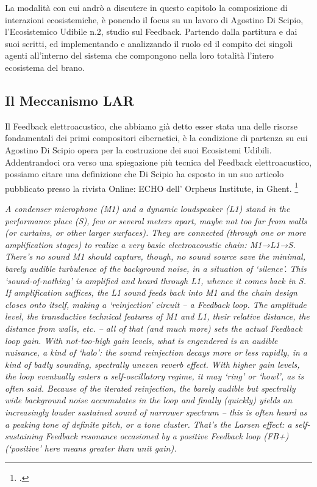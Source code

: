 La modalità con cui andrò a discutere in questo capitolo la composizione di interazioni ecosistemiche, 
è ponendo il focus su un lavoro di Agostino Di Scipio, l’Ecosistemico Udibile n.2, studio sul Feedback. 
Partendo dalla partitura e dai suoi scritti, ed implementando e analizzando
il ruolo ed il compito dei singoli agenti all'interno del sistema 
che compongono nella loro totalità l'intero ecosistema del brano. 

\subsection{Il Meccanismo LAR}
\label{sec:Il Meccanismo LAR}
Il Feedback elettroacustico, che abbiamo già detto
esser stata una delle risorse fondamentali dei primi compositori cibernetici,
è la condizione di partenza su cui Agostino Di Scipio opera per la costruzione dei suoi Ecosistemi Udibili.
Addentrandoci ora verso una spiegazione più tecnica del Feedback elettroacustico,
possiamo citare una definizione che Di Scipio ha esposto in un suo articolo
pubblicato presso la rivista Online: ECHO dell’ Orpheus Institute, in
Ghent. \footcite{di_scipio_relational_2022}

\begin{center}
\vspace{0.5cm}
\textit{A condenser microphone (M1) and a dynamic loudspeaker (L1) stand in the performance place
(S), few or several meters apart, maybe not too far from walls (or curtains, or other larger
surfaces). They are connected (through one or more amplification stages) to realize a very
basic electroacoustic chain: M1→L1→S. There’s no sound M1 should capture, though, no sound
source save the minimal, barely audible turbulence of the background noise, in a situation of
‘silence’. This ‘sound-of-nothing’ is amplified and heard through L1, whence it comes back in
S. \\
If amplification suffices, the L1 sound feeds back into M1 and the chain design closes onto
itself, making a ‘reinjection’ circuit – a Feedback loop. The amplitude level, the
transductive technical features of M1 and L1, their relative distance, the distance from
walls, etc. – all of that (and much more) sets the actual Feedback loop gain. With
not-too-high gain levels, what is engendered is an audible nuisance, a kind of ‘halo’: the
sound reinjection decays more or less rapidly, in a kind of badly sounding, spectrally uneven
reverb effect. With higher gain levels, the loop eventually enters a self-oscillatory regime,
it may ‘ring’ or ‘howl’, as is often said. Because of the iterated reinjection, the barely
audible but spectrally wide background noise accumulates in the loop and finally (quickly)
yields an increasingly louder sustained sound of narrower spectrum – this is often heard as a
peaking tone of definite pitch, or a tone cluster. That’s the Larsen effect: a self-sustaining
Feedback resonance occasioned by a positive Feedback loop (FB+) (‘positive’ here means greater
than unit gain).}
\vspace{0.5cm}
\vspace{0.5cm}
\end{center}

